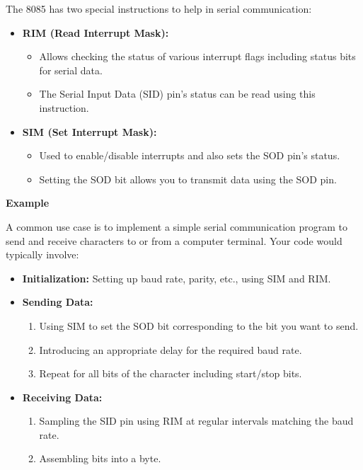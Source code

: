 \documentclass[
]{article}
\begin{document}
The 8085 has two special instructions to help in serial communication:

\begin{itemize}
\item
  \textbf{RIM (Read Interrupt Mask):}

  \begin{itemize}
  \item
    Allows checking the status of various interrupt flags including
    status bits for serial data.
  \item
    The Serial Input Data (SID) pin's status can be read using this
    instruction.
  \end{itemize}
\item
  \textbf{SIM (Set Interrupt Mask):}

  \begin{itemize}
  \item
    Used to enable/disable interrupts and also sets the SOD pin's
    status.
  \item
    Setting the SOD bit allows you to transmit data using the SOD pin.
  \end{itemize}
\end{itemize}

\textbf{Example}

A common use case is to implement a simple serial communication program
to send and receive characters to or from a computer terminal. Your code
would typically involve:

\begin{itemize}
\item
  \textbf{Initialization:} Setting up baud rate, parity, etc., using SIM
  and RIM.
\item
  \textbf{Sending Data:}

  \begin{enumerate}
  \def\labelenumi{\arabic{enumi}.}
  \item
    Using SIM to set the SOD bit corresponding to the bit you want to
    send.
  \item
    Introducing an appropriate delay for the required baud rate.
  \item
    Repeat for all bits of the character including start/stop bits.
  \end{enumerate}
\item
  \textbf{Receiving Data:}

  \begin{enumerate}
  \def\labelenumi{\arabic{enumi}.}
  \item
    Sampling the SID pin using RIM at regular intervals matching the
    baud rate.
  \item
    Assembling bits into a byte.
  \end{enumerate}
\end{itemize}
\end{document}
